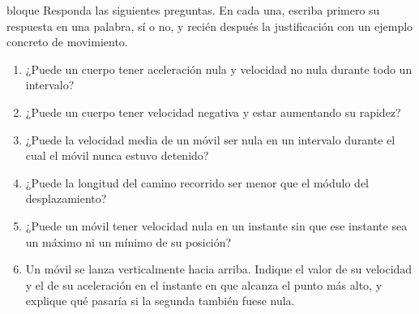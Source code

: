\documentclass[11pt,openany]{book}
\begin{document}
\begin{ejercicio}{bloque}
Responda las siguientes preguntas. En cada una, escriba primero su respuesta en una palabra, sí o no, y recién después la justificación con un ejemplo concreto de movimiento.
\begin{enumerate}[label=(\alph*), leftmargin=1.7em, itemsep=1pt, topsep=3pt]
  \item ¿Puede un cuerpo tener aceleración nula y velocidad no nula durante todo un intervalo?
  \item ¿Puede un cuerpo tener velocidad negativa y estar aumentando su rapidez?
  \item ¿Puede la velocidad media de un móvil ser nula en un intervalo durante el cual el móvil nunca estuvo detenido?
  \item ¿Puede la longitud del camino recorrido ser menor que el módulo del desplazamiento?
  \item ¿Puede un móvil tener velocidad nula en un instante sin que ese instante sea un máximo ni un mínimo de su posición?
  \item Un móvil se lanza verticalmente hacia arriba. Indique el valor de su velocidad y el de su aceleración en el instante en que alcanza el punto más alto, y explique qué pasaría si la segunda también fuese nula.
\end{enumerate}
\end{ejercicio}
\end{document}
